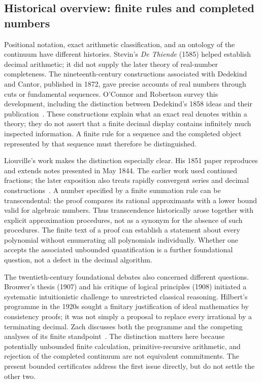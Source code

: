 \documentclass[11pt,reqno]{amsart}
\theoremstyle{blueplain}
\newcounter{asser}
\numberwithin{equation}{section}
\begin{document}
\subsection{Historical overview: finite rules and completed numbers}\label{sec:historical-overview}
Positional notation, exact arithmetic classification, and an ontology of the
continuum have different histories. Stevin's \emph{De Thiende} (1585)
helped establish decimal arithmetic; it did not supply the later theory of
real-number completeness. The nineteenth-century constructions associated
with Dedekind and Cantor, published in 1872, gave precise accounts of real
numbers through cuts or fundamental sequences. O'Connor and Robertson
survey this development, including the distinction between Dedekind's
1858 ideas and their publication~\cite{RealNumbersHistory2005}.
These constructions explain what an exact real denotes within a theory;
they do not assert that a finite decimal display contains infinitely much
inspected information. A finite rule for a sequence and the completed
object represented by that sequence must therefore be distinguished.

Liouville's work makes the distinction especially clear. His 1851 paper
reproduces and extends notes presented in May 1844. The earlier work used
continued fractions; the later exposition also treats rapidly convergent
series and decimal constructions~\cite[pp.~133--140]{Liouville1851}.
A number specified by a finite summation rule can be transcendental: the
proof compares its rational approximants with a lower bound valid for
algebraic numbers. Thus transcendence historically arose together with
explicit approximation procedures, not as a synonym for the absence of
such procedures. The finite text of a proof can establish a statement
about every polynomial without enumerating all polynomials individually.
Whether one accepts the associated unbounded quantification is a further
foundational question, not a defect in the decimal algorithm.

The twentieth-century foundational debates also concerned different
questions. Brouwer's thesis (1907) and his critique of logical principles
(1908) initiated a systematic intuitionistic challenge to unrestricted
classical reasoning. Hilbert's programme in the 1920s sought a finitary
justification of ideal mathematics by consistency proofs; it was not
simply a proposal to replace every irrational by a terminating decimal.
Zach discusses both the programme and the competing analyses of its
finite standpoint~\cite{Zach2023}. The distinction matters here because
potentially unbounded finite calculation, primitive-recursive arithmetic,
and rejection of the completed continuum are not equivalent commitments.
The present bounded certificates address the first issue directly, but do
not settle the other two.
\end{document}

